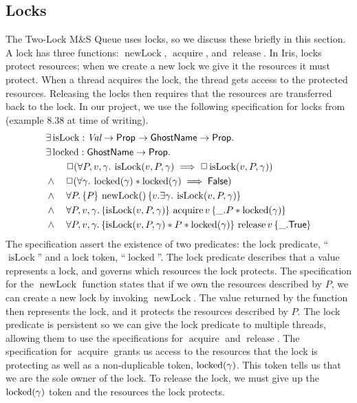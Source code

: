 \documentclass[a4paper, 10pt]{report}
\theoremstyle{definition}
\newcommand{\isLock}{\operatorname{isLock}}
\newcommand{\locked}{\operatorname{locked}}
\newcommand{\newLock}{\operatorname{newLock}}
\newcommand{\acquire}{\operatorname{acquire}}
\newcommand{\release}{\operatorname{release}}
\newcommand{\msq}{M\&S Queue}
\newcommand{\tlmsq}{Two-Lock \msq{}}
\begin{document}
\subsection{Locks}\label{Pre:iris:locks}

The \tlmsq{} uses locks, so we discuss these briefly in this section. A lock has three functions: $\newLock$, $\acquire$, and $\release$. In Iris, locks protect resources; when we create a new lock we give it the resources it must protect. When a thread acquires the lock, the thread gets access to the protected resources. Releasing the locks then requires that the resources are transferred back to the lock. In our project, we use the following specification for locks from \citet{gentleiris} (example 8.38 at time of writing).
\begin{align*}
  &\Exists \isLock : \Val \to \Prop \to \textlog{GhostName} \to \Prop.\nonumber\\
  &\Exists \locked : \textlog{GhostName} \to \Prop.\nonumber\\
  &\quad\quad\persistently(\All P, v, \gamma. \isLock(v,P,\gamma) \implies \persistently \isLock(v,P,\gamma))\\
  &\land\quad\persistently(\All \gamma. \locked(\gamma) \ast \locked(\gamma) \implies \FALSE)\\
  &\land\quad\All P.\hoare{P}{\newLock ()}{v.\Exists \gamma.\isLock(v,P,\gamma)}\\
  &\land\quad\All P, v, \gamma.\hoare{\isLock(v,P,\gamma)}{\acquire v}{\_.P \ast \locked(\gamma)}\\
  &\land\quad\All P, v, \gamma.\hoare{\isLock(v,P,\gamma) \ast P \ast \locked(\gamma)}{\release v}{\_.\TRUE}
\end{align*}
The specification assert the existence of two predicates: the lock predicate, ``$\isLock$'' and a lock token, ``$\locked$''. The lock predicate describes that a value represents a lock, and governs which resources the lock protects. The specification for the $\newLock$ function states that if we own the resources described by $P$, we can create a new lock by invoking $\newLock$. The value returned by the function then represents the lock, and it protects the resources described by $P$. The lock predicate is persistent so we can give the lock predicate to multiple threads, allowing them to use the specifications for $\acquire$ and $\release$. The specification for $\acquire$ grants us access to the resources that the lock is protecting as well as a non-duplicable token, $\locked(\gname)$. This token tells us that we are the sole owner of the lock. To release the lock, we must give up the $\locked(\gname)$ token and the resources the lock protects.
\end{document}
